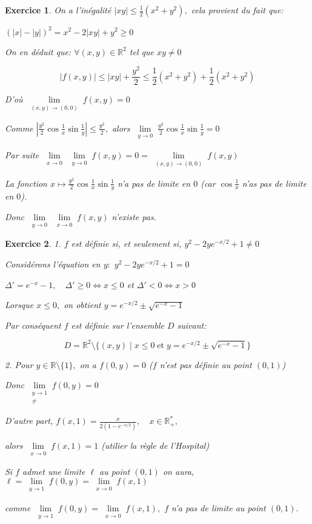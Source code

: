 \documentclass[11pt,a4paper]{report}
\newtheorem{exo}{Exercice}[section]
\begin{document}
\begin{exo}
On a l'inégalité $|xy|\leq \frac{1}{2}(x^2+y^2),$ cela provient du fait que:

$(|x|-|y|)^2=x^2-2|xy|+y^2\geq0$

On en déduit que: $\forall (x,y)\in \mathbb{R}^2$ tel que $xy\neq0$

$$|f(x,y)|\leq |xy|+\frac{y^2}{2}\leq \frac{1}{2}(x^2+y^2)+\frac{1}{2}(x^2+y^2)$$

D'où $\lim\limits_{\substack{(x,y) \rightarrow (0,0)}}f(x,y)=0$

Comme $|\frac{y^2}{2}\cos\frac{1}{x}\sin\frac{1}{y}|\leq \frac{y^2}{2},$ alors $\lim\limits_{\substack{y \rightarrow 0}}\frac{y^2}{2}\cos\frac{1}{x}\sin\frac{1}{y}=0$

Par suite $\lim\limits_{\substack{x \rightarrow 0}}\lim\limits_{\substack{y \rightarrow 0}}f(x,y)=0=\lim\limits_{\substack{(x,y) \rightarrow (0,0)}}f(x,y)$

La fonction $x\mapsto\frac{y^2}{2}\cos\frac{1}{x}\sin\frac{1}{y}$ n'a pas de limite en $0$ (car $\cos\frac{1}{x}$ n'as pas de limite en $0$).

Donc $\lim\limits_{\substack{y \rightarrow 0}}\lim\limits_{\substack{x \rightarrow 0}}f(x,y)$ n'existe pas.
\end{exo}
\begin{exo}
1. $f$ est définie si, et seulement si, $y^2-2ye^{-x/2}+1\neq0$

Considérons l'équation en $y:$ $y^2-2ye^{-x/2}+1=0$

$\Delta'=e^{-x}-1,\quad \Delta'\geq0\Leftrightarrow x\leq0$ et $\Delta'<0\Leftrightarrow x>0$

Lorsque $x\leq 0,$ on obtient $y=e^{-x/2}\pm \sqrt{e^{-x}-1}$

Par conséquent $f$ est définie sur l'ensemble $D$ suivant:

$$D=\mathbb{R}^2\setminus\{(x,y)\mid x\leq0\;\mbox{et}\;y=e^{-x/2}\pm \sqrt{e^{-x}-1}\}$$

2. Pour $y\in \mathbb{R}\setminus\{1\},$ on a $f(0,y)=0$ ($f$ n'est pas définie au point $(0,1)$)

Donc $\lim\limits_{\substack{y \rightarrow 1\\ \neq}}f(0,y)=0$

D'autre part, $f(x,1)=\frac{x}{2(1-e^{-x/2})},\quad x\in \mathbb{R}_{+}^{*},$

alors $\lim\limits_{\substack{x \rightarrow 0}}f(x,1)=1$ (utilier la règle de l'Hospital)

Si $f$ admet une limite $\ell$ au point $(0,1)$ on aura, $\ell=\lim\limits_{\substack{y \rightarrow 1}}f(0,y)=\lim\limits_{\substack{x \rightarrow 0}}f(x,1)$

comme $\lim\limits_{\substack{y \rightarrow 1}}f(0,y)=\lim\limits_{\substack{x \rightarrow 0}}f(x,1),$ $f$ n'a pas de limite au point $(0,1).$
\end{exo}
\end{document}
